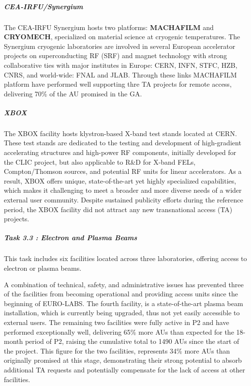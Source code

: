 \subparagraph{CEA-IRFU/Synergium}

The CEA-IRFU Synergium hosts two platforms: \textbf{MACHAFILM} and \textbf{CRYOMECH}, specialized on material science at cryogenic temperatures. The Synergium cryogenic laboratories are involved in several European accelerator projects on superconducting RF (SRF) and magnet technology with strong collaborative ties with major institutes in Europe: CERN, INFN, STFC, HZB, CNRS, and world-wide: FNAL and JLAB. Through these links MACHAFILM platform have performed well supporting thre TA projects for remote access, delivering 70\% of the AU promised in the GA.

\subparagraph{XBOX}

The XBOX facility hosts klystron-based X-band test stands located at CERN. These test stands are dedicated to the testing and development of high-gradient accelerating structures and high-power RF components, initially developed for the CLIC project, but also applicable to R\&D for X-band FELs, Compton/Thomson sources, and potential RF units for linear accelerators. As a result, XBOX offers unique, state-of-the-art yet highly specialized capabilities, which makes it challenging to meet a broader and more diverse needs of a wider external user community.
Despite sustained publicity efforts during the reference period, the XBOX facility did not attract any new transnational access (TA) projects. 

\subparagraph{Task 3.3 : Electron and Plasma Beams} \mbox{}


This task includes six facilities located across three laboratories, offering access to electron or plasma beams.

A combination of technical, safety, and administrative issues has prevented three of the facilities from becoming operational and providing access units since the beginning of EURO-LABS. The fourth facility, is a state-of-the-art plasma beam installation, which is currently being upgraded, thus not yet easily accessible to external users. The remaining two facilities were fully active in P2 and have performed exceptionally well, delivering 65\% more AUs than expected for the 18-month period of P2, raising the cumulative total to 1490 AUs since the start of the project. This figure for the two facilities, represents 34\% more AUs than originally promised at this stage, demonstrating their strong potential to absorb additional TA requests and potentially compensate for the lack of access at other facilities.

